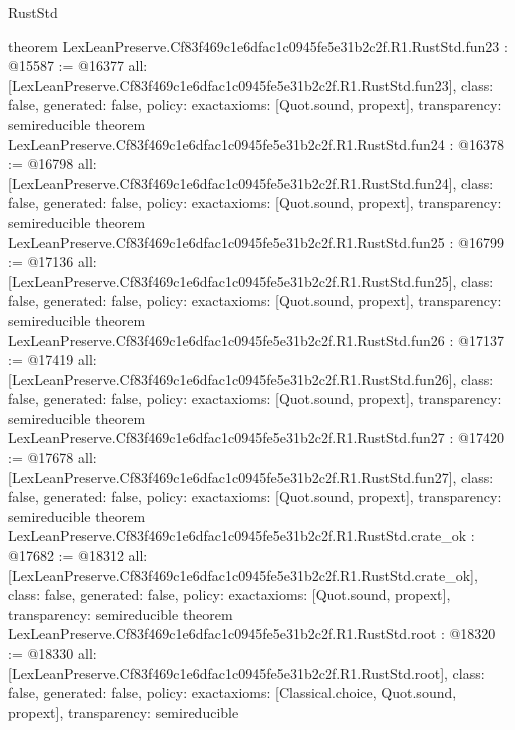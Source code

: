 \begin{lexlean}{RustStd}
\begin{coremodule}
{}
theorem LexLeanPreserve.Cf83f469c1e6dfac1c0945fe5e31b2c2f.R1.RustStd.fun23 : @15587 := @16377 {
  all: [LexLeanPreserve.Cf83f469c1e6dfac1c0945fe5e31b2c2f.R1.RustStd.fun23],
  class: false,
  generated: false,
  policy: exact{axioms: [Quot.sound, propext]},
  transparency: semireducible
}
theorem LexLeanPreserve.Cf83f469c1e6dfac1c0945fe5e31b2c2f.R1.RustStd.fun24 : @16378 := @16798 {
  all: [LexLeanPreserve.Cf83f469c1e6dfac1c0945fe5e31b2c2f.R1.RustStd.fun24],
  class: false,
  generated: false,
  policy: exact{axioms: [Quot.sound, propext]},
  transparency: semireducible
}
theorem LexLeanPreserve.Cf83f469c1e6dfac1c0945fe5e31b2c2f.R1.RustStd.fun25 : @16799 := @17136 {
  all: [LexLeanPreserve.Cf83f469c1e6dfac1c0945fe5e31b2c2f.R1.RustStd.fun25],
  class: false,
  generated: false,
  policy: exact{axioms: [Quot.sound, propext]},
  transparency: semireducible
}
theorem LexLeanPreserve.Cf83f469c1e6dfac1c0945fe5e31b2c2f.R1.RustStd.fun26 : @17137 := @17419 {
  all: [LexLeanPreserve.Cf83f469c1e6dfac1c0945fe5e31b2c2f.R1.RustStd.fun26],
  class: false,
  generated: false,
  policy: exact{axioms: [Quot.sound, propext]},
  transparency: semireducible
}
theorem LexLeanPreserve.Cf83f469c1e6dfac1c0945fe5e31b2c2f.R1.RustStd.fun27 : @17420 := @17678 {
  all: [LexLeanPreserve.Cf83f469c1e6dfac1c0945fe5e31b2c2f.R1.RustStd.fun27],
  class: false,
  generated: false,
  policy: exact{axioms: [Quot.sound, propext]},
  transparency: semireducible
}
theorem LexLeanPreserve.Cf83f469c1e6dfac1c0945fe5e31b2c2f.R1.RustStd.crate_ok : @17682 := @18312 {
  all: [LexLeanPreserve.Cf83f469c1e6dfac1c0945fe5e31b2c2f.R1.RustStd.crate_ok],
  class: false,
  generated: false,
  policy: exact{axioms: [Quot.sound, propext]},
  transparency: semireducible
}
theorem LexLeanPreserve.Cf83f469c1e6dfac1c0945fe5e31b2c2f.R1.RustStd.root : @18320 := @18330 {
  all: [LexLeanPreserve.Cf83f469c1e6dfac1c0945fe5e31b2c2f.R1.RustStd.root],
  class: false,
  generated: false,
  policy: exact{axioms: [Classical.choice, Quot.sound, propext]},
  transparency: semireducible
}


\end{coremodule}
\end{lexlean}
